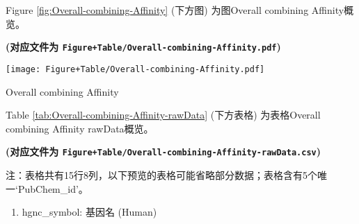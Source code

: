 \documentclass[
]{article}
\providecommand{\tightlist}{%
  \setlength{\itemsep}{0pt}\setlength{\parskip}{0pt}}
\begin{document}
Figure \ref{fig:Overall-combining-Affinity} (下方图) 为图Overall combining Affinity概览。

\textbf{(对应文件为 \texttt{Figure+Table/Overall-combining-Affinity.pdf})}

\def\@captype{figure}
\begin{center}
\texttt{[image: Figure+Table/Overall-combining-Affinity.pdf]}
\caption{Overall combining Affinity}\label{fig:Overall-combining-Affinity}
\end{center}

Table \ref{tab:Overall-combining-Affinity-rawData} (下方表格) 为表格Overall combining Affinity rawData概览。

\textbf{(对应文件为 \texttt{Figure+Table/Overall-combining-Affinity-rawData.csv})}

\begin{center}\begin{tcolorbox}[colback=gray!10, colframe=gray!50, width=0.9\linewidth, arc=1mm, boxrule=0.5pt]注：表格共有15行8列，以下预览的表格可能省略部分数据；表格含有5个唯一`PubChem\_id'。
\end{tcolorbox}
\end{center}
\begin{center}\begin{tcolorbox}[colback=gray!10, colframe=gray!50, width=0.9\linewidth, arc=1mm, boxrule=0.5pt]\begin{enumerate}\tightlist
\item hgnc\_symbol:  基因名 (Human)
\end{enumerate}\end{tcolorbox}
\end{center}
\end{document}
